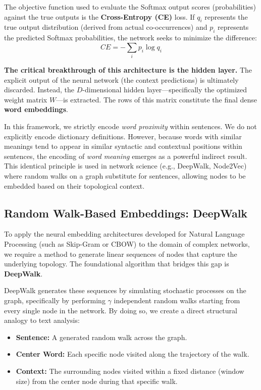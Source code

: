 The objective function used to evaluate the Softmax output scores (probabilities) against the true outputs is the \textbf{Cross-Entropy (CE)} loss. If $q_i$ represents the true output distribution (derived from actual co-occurrences) and $p_i$ represents the predicted Softmax probabilities, the network seeks to minimize the difference:
$$CE = - \sum_{i} p_i \log q_i$$

\textbf{The critical breakthrough of this architecture is the hidden layer.} The explicit output of the neural network (the context predictions) is ultimately discarded. Instead, the $D$-dimensional hidden layer—specifically the optimized weight matrix $W$—is extracted. The rows of this matrix constitute the final dense \textbf{word embeddings}.

In this framework, we strictly encode \textit{word proximity} within sentences. We do not explicitly encode dictionary definitions. However, because words with similar meanings tend to appear in similar syntactic and contextual positions within sentences, the encoding of \textit{word meaning} emerges as a powerful indirect result. This identical principle is used in network science (e.g., DeepWalk, Node2Vec) where random walks on a graph substitute for sentences, allowing nodes to be embedded based on their topological context.

\subsection{Random Walk-Based Embeddings: DeepWalk}
\label{subsec:deepwalk}

To apply the neural embedding architectures developed for Natural Language Processing (such as Skip-Gram or CBOW) to the domain of complex networks, we require a method to generate linear sequences of nodes that capture the underlying topology. The foundational algorithm that bridges this gap is \textbf{DeepWalk}.

DeepWalk generates these sequences by simulating stochastic processes on the graph, specifically by performing $\gamma$ independent random walks starting from every single node in the network. By doing so, we create a direct structural analogy to text analysis:
\begin{itemize}
    \item \textbf{Sentence:} A generated random walk across the graph.
    \item \textbf{Center Word:} Each specific node visited along the trajectory of the walk.
    \item \textbf{Context:} The surrounding nodes visited within a fixed distance (window size) from the center node during that specific walk.
\end{itemize}

